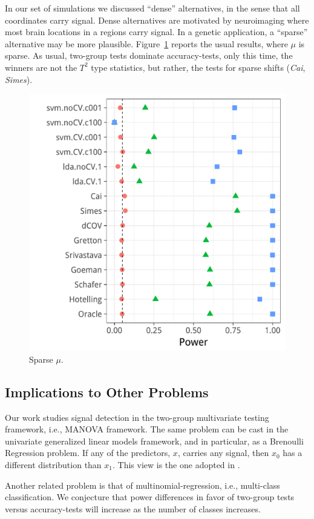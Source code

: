 \documentclass[]{bio}
\begin{document}
In our set of simulations we discussed ``dense'' alternatives, in the sense that all coordinates carry signal.
Dense alternatives are motivated by neuroimaging where most brain locations in a regions carry signal.
In a genetic application, a ``sparse'' alternative may be more plausible. 
Figure~\ref{fig:sparse} reports the usual results, where $\mu$ is sparse. 
As usual, two-group tests dominate accuracy-tests, only this time, the winners are not the $T^2$ type statistics, but rather, the tests for sparse shifts (\emph{Cai}, \emph{Simes}).

\begin{figure}[ht]
	\centering
	\centering
	\includegraphics[width=0.7\columnwidth]{"art/file34"}
	\caption{Sparse $\mu$.}  
	\label{fig:sparse}	
\end{figure}



\subsection{Implications to Other Problems}

Our work studies signal detection in the two-group multivariate testing framework, i.e., MANOVA framework.
The same problem can be cast in the univariate generalized linear models framework, and in particular, as a Brenoulli Regression problem.
If any of the predictors, $x$, carries any signal, then $x_0$ has a different distribution than $x_1$.
This view is the one adopted in \cite{goeman2006testing}.

Another related problem is that of multinomial-regression, i.e., multi-class classification.
We conjecture that power differences in favor of two-group tests versus accuracy-tests will increase as the number of classes increases.
\end{document}
